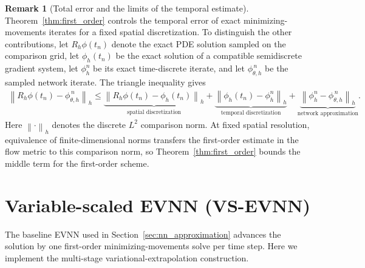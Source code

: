 \documentclass[11pt,letterpaper]{article}
\theoremstyle{plain}
\theoremstyle{definition}
\newtheorem{remark}{Remark}[section]
\newcommand{\norm}[1]{\left\| #1 \right\|}
\begin{document}
\begin{remark}[Total error and the limits of the temporal estimate]
\label{rem:total-error}
Theorem~\ref{thm:first_order} controls the temporal error of exact minimizing-movements iterates for a fixed spatial discretization. To distinguish the other contributions, let $R_h\phi(t_n)$ denote the exact PDE solution sampled on the comparison grid, let $\phi_h(t_n)$ be the exact solution of a compatible semidiscrete gradient system, let $\phi_h^n$ be its exact time-discrete iterate, and let $\phi_{\theta,h}^{\,n}$ be the sampled network iterate. The triangle inequality gives
\begin{equation}
\begin{aligned}
\norm{R_h\phi(t_n)-\phi_{\theta,h}^{\,n}}_h
\le{}\underbrace{\norm{R_h\phi(t_n)-\phi_h(t_n)}_h}_{\text{spatial discretization}}
+\underbrace{\norm{\phi_h(t_n)-\phi_h^n}_h}_{\text{temporal discretization}}
+\underbrace{\norm{\phi_h^n-\phi_{\theta,h}^{\,n}}_h}_{\text{network approximation}}.
\end{aligned}
\label{eq:total-error}
\end{equation}
Here $\norm{\cdot}_h$ denotes the discrete $L^2$ comparison norm. At fixed spatial resolution, equivalence of finite-dimensional norms transfers the first-order estimate in the flow metric to this comparison norm, so Theorem~\ref{thm:first_order} bounds the middle term for the first-order scheme. 
\end{remark}
\section{Variable-scaled EVNN (VS-EVNN)}

The baseline EVNN used in Section~\ref{sec:nn_approximation} advances the solution by one first-order minimizing-movements solve per time step. Here we implement the multi-stage variational-extrapolation construction. 
\end{document}
